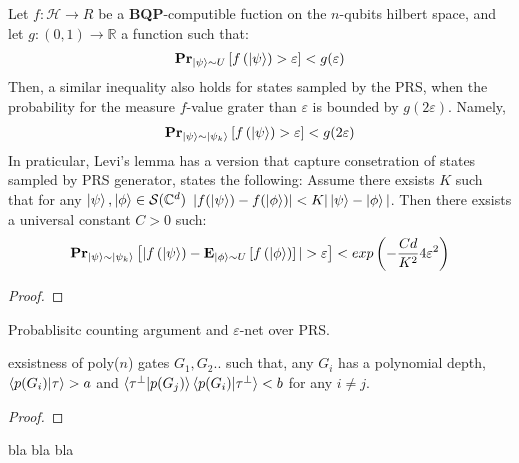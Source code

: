 \documentclass[manuscript,screen,review]{acmart}
\begin{document}
\begin{claim}
  Let $f : \mathcal{H} \rightarrow R$ be a \textbf{BQP}-computible fuction on
  the $n$-qubits hilbert space, and let $g: (0,1) \rightarrow \mathbb{R} $ a
  function such that:
  \begin{equation*}
    \begin{split}
      \prbm{f\left(\ket{\psi} \right) > \varepsilon}{ \ket{\psi} \sim U} <
      g(\varepsilon)
    \end{split}
  \end{equation*}
  Then, a similar inequality also holds for states sampled by the PRS, when the
  probability for the measure $f$-value grater than $\varepsilon$ is bounded by
  $g(2\varepsilon)$. Namely,
  \begin{equation*}
    \begin{split}
      \prbm{f\left(\ket{\psi} \right) > \varepsilon}{ \ket{\psi} \sim
      \ket{\psi_{k}} } < g(2\varepsilon)
    \end{split}
  \end{equation*}
  In praticular, Levi's lemma has a version that capture consetration of states
  sampled by PRS generator, states the following: Assume there exsists $K$ such
  that for any $\ket{\psi},\ket{\phi} \in \mathcal{S}(\mathbb{C}^{d})$
  $|f(\ket{\psi}) - f(\ket{\phi})| < K | \ket{\psi} - \ket{\phi}|$. Then there
  exsists a universal constant $C > 0$ such:
  \begin{equation*}
    \begin{split}
      \prbm{ |f\left(\ket{\psi} \right) -
      \exppm{f\left(\ket{\phi}\right)}{\ket{\phi} \sim U}| > \varepsilon}{
      \ket{\psi} \sim \ket{\psi_{k}} } < exp\left(-\frac{Cd}{K^{2}}
      4\varepsilon^{2} \right)
    \end{split}
  \end{equation*}
\end{claim}

\begin{proof}

\end{proof}

\begin{claim}
  Probablisitc counting argument and $\varepsilon$-net over PRS.
\end{claim}

\begin{claim}
  exsistness of poly($n$) gates $G_{1}, G_{2} ..$ such that, any $G_{i}$ has a
  polynomial depth, $\braket{p(G_{i})|\tau} > a$ and
  $\braket{\tau^{\perp}|p(G_{j})}\braket{p(G_{i})|\tau^{\perp}} < b$ for any
  $i\neq j$.
\end{claim}
\begin{proof}

\end{proof}
\begin{claim}
  bla bla bla
\end{claim}
\end{document}

